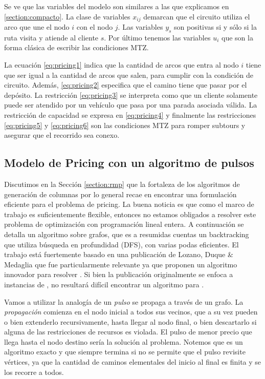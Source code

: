 Se ve que las variables del modelo son similares a las que explicamos en \ref{section:compacto}. La clase de variables $x_{ij}$ demarcan que el circuito utiliza el arco que une el nodo $i$ con el nodo $j$. Las variables $y_s$ son positivas si y sólo si la ruta visita y atiende al cliente $s$. Por último tenemos las variables $u_i$ que son la forma clásica de escribir las condiciones MTZ.

La ecuación \ref{eq:pricing1} indica que la cantidad de arcos que entra al nodo $i$ tiene que ser igual a la cantidad de arcos que salen, para cumplir con la condición de circuito. Además, \ref{eq:pricing2} especifica que el camino tiene que pasar por el depósito. La restricción \ref{eq:pricing3} se interpreta como que un cliente solamente puede ser atendido por un vehículo que pasa por una parada asociada válida. La restricción de capacidad se expresa en \ref{eq:pricing4} y finalmente las restricciones \ref{eq:pricing5} y \ref{eq:pricing6} son las condiciones MTZ para romper subtours y asegurar que el recorrido sea conexo.

\subsection{Modelo de Pricing con un algoritmo de pulsos}
\label{section:pricing-pulses}

Discutimos en la Sección \ref{section:rmp} que la fortaleza de los algoritmos de generación de columnas por lo general recae en encontrar una formulación eficiente para el problema de pricing. La buena noticia es que como el marco de trabajo es suficientemente flexible, entonces no estamos obligados a resolver este problema de optimización con programación lineal entera. A continuación se detalla un algoritmo sobre grafos, que es a resumidas cuentas un backtracking que utiliza búsqueda en profundidad (DFS), con varias podas eficientes. El trabajo está fuertemente basado en una publicación de Lozano, Duque \& Medaglia \cite{lozano-duque-medaglia} que fue particularmente relevante ya que proponen un algoritmo innovador para resolver . Si bien la publicación originalmente se enfoca a instancias de , no resultará difícil encontrar un algoritmo para .

Vamos a utilizar la analogía de un \emph{pulso} se propaga a través de un grafo. La \emph{propagación} comienza en el nodo inicial a todos sus vecinos, que a su vez pueden o bien extenderlo recursivamente, hasta llegar al nodo final, o bien descartarlo si alguna de las restricciones de recursos es violada. El pulso de menor precio que llega hasta el nodo destino sería la solución al problema. Notemos que es un algoritmo exacto y que siempre termina si no se permite que el pulso revisite vértices, ya que la cantidad de caminos elementales del inicio al final es finita y se los recorre a todos. 

